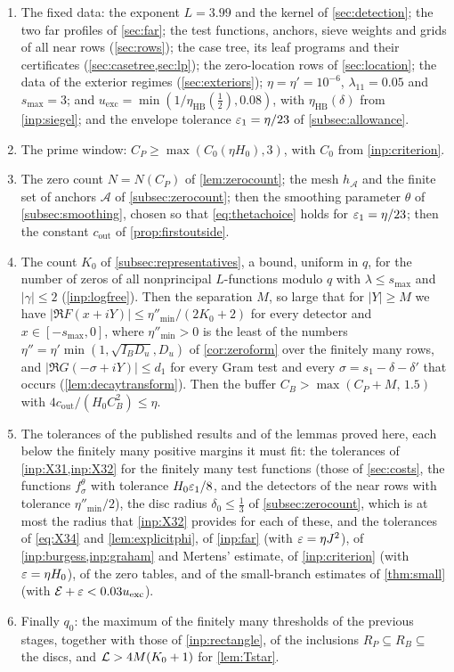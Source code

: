 \begin{enumerate}[(S1)]
  \item The fixed data: the exponent $L=3.99$ and the kernel of \cref{sec:detection}; the two far
    profiles of \cref{sec:far}; the test functions, anchors, sieve weights and grids of all near
    rows (\cref{sec:rows}); the case tree, its leaf programs and their certificates
    (\cref{sec:casetree,sec:lp}); the zero-location rows of \cref{sec:location}; the data of the
    exterior regimes (\cref{sec:exteriors}); $\eta=\eta'=10^{-6}$, $\lambda_{11}=0.05$ and $s_{\max}=3$; and
    $u_{\mathrm{exc}}=\min(1/\eta_{\mathrm{HB}}(\frac12),0.08)$, with $\eta_{\mathrm{HB}}(\delta)$ from \cref{inp:siegel}; and the envelope tolerance
$\varepsilon_1=\eta/23$ of \cref{subsec:allowance}.
  \item The prime window: $C_P\ge\max(C_0(\eta H_0),3)$, with $C_0$ from \cref{inp:criterion}.
  \item The zero count $N=N(C_P)$ of \cref{lem:zerocount}; the mesh $h_{\mathcal A}$ and the finite set
    of anchors $\mathcal A$ of \cref{subsec:zerocount}; then the smoothing parameter $\theta$ of
    \cref{subsec:smoothing}, chosen so that \eqref{eq:thetachoice} holds for $\varepsilon_1=\eta/23$; then the
    constant $c_{\mathrm{out}}$ of \cref{prop:firstoutside}.
  \item The count $K_0$ of \cref{subsec:representatives}, a bound, uniform in $q$, for the number
    of zeros of all nonprincipal $L$-functions modulo $q$ with $\lambda\le s_{\max}$ and $|\gamma|\le2$
    (\cref{inp:logfree}). Then the separation $M$, so large that for $|Y|\ge M$ we have
    $|\Re F(x+iY)|\le\eta''_{\min}/(2K_0+2)$ for every detector and $x\in[-s_{\max},0]$, where
    $\eta''_{\min}>0$ is the least of the numbers $\eta''=\eta'\min(1,\sqrt{I_BD_u},D_u)$ of
    \cref{cor:zeroform} over the finitely many rows, and
    $|\Re G(-\sigma+iY)|\le d_1$ for every Gram test and every $\sigma=s_1-\delta-\delta'$ that occurs
    (\cref{lem:decaytransform}). Then the buffer $C_B>\max(C_P+M,\,1.5)$ with
    $4c_{\mathrm{out}}/(H_0C_B^2)\le\eta$.
  \item The tolerances of the published results and of the lemmas proved here, each below the
    finitely many positive margins it must fit: the tolerances of \cref{inp:X31,inp:X32} for the
    finitely many test functions (those of \cref{sec:costs}, the functions $f^\theta_\sigma$ with tolerance
    $H_0\varepsilon_1/8$, and the detectors of the near rows with tolerance $\eta''_{\min}/2$), the disc radius $\delta_0\le\frac13$ of \cref{subsec:zerocount},
    which is at most the radius that \cref{inp:X32} provides for each of these, and the tolerances
    of \eqref{eq:X34} and \cref{lem:explicitphi}, of
    \cref{inp:far} (with $\varepsilon=\eta J^2$), of \cref{inp:burgess,inp:graham} and Mertens' estimate, of
    \cref{inp:criterion} (with $\varepsilon=\eta H_0$), of the zero tables, and of the small-branch
    estimates of \cref{thm:small} (with $\mathcal E+\varepsilon<0.03u_{\mathrm{exc}}$).
  \item Finally $q_0$: the maximum of the finitely many thresholds of the previous stages, together
    with those of \cref{inp:rectangle}, of the inclusions $R_P\subseteq R_B\subseteq$ the discs, and
    $\mathcal{L}>4M(K_0+1)$ for \cref{lem:Tstar}.
\end{enumerate}
